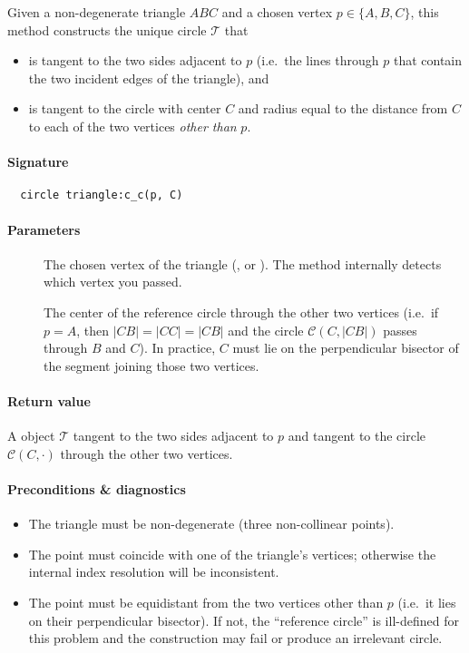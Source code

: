 \medskip
\noindent
Given a non-degenerate triangle $ABC$ and a chosen vertex $p\in\{A,B,C\}$, this method constructs the unique circle $\mathcal{T}$ that
\begin{itemize}
  \item is tangent to the two sides adjacent to $p$ (i.e.\ the lines through $p$ that contain the two incident edges of the triangle), and
  \item is tangent to the circle with center $C$ and radius equal to the distance from \(C\) to each of the two vertices \emph{other than} $p$.
\end{itemize}

\paragraph*{Signature}
\begin{verbatim}
  circle triangle:c_c(p, C)
\end{verbatim}

\paragraph*{Parameters}
\begin{description}
  \item[] The chosen vertex of the triangle (,  or ). The method internally detects which vertex you passed.
  \item[] The center of the reference circle through the other two vertices (i.e.\ if \(p=A\), then \(|CB|=|CC|=|C\!B|\) and the circle \(\mathcal{C}(C,|CB|)\) passes through \(B\) and \(C\)). In practice, \(C\) must lie on the perpendicular bisector of the segment joining those two vertices.
\end{description}

\paragraph*{Return value}
A  object $\mathcal{T}$ tangent to the two sides adjacent to \(p\) and tangent to the circle $\mathcal{C}(C,\cdot)$ through the other two vertices.


\paragraph*{Preconditions \& diagnostics}
\begin{itemize}
  \item The triangle must be non-degenerate (three non-collinear points).
  \item The point  must coincide with one of the triangle’s vertices; otherwise the internal index resolution will be inconsistent.
  \item The point  must be equidistant from the two vertices other than \(p\) (i.e.\ it lies on their perpendicular bisector). If not, the “reference circle” is ill-defined for this problem and the construction may fail or produce an irrelevant circle.
\end{itemize}

